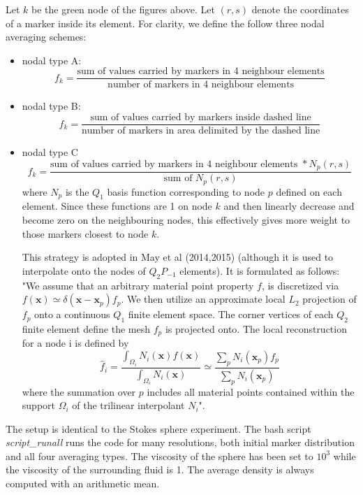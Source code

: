 Let $k$ be the green node of the figures above. Let $(r,s)$ denote the coordinates of a marker inside its element.
For clarity, we define the follow three nodal averaging schemes:
\begin{itemize}
\item nodal type A: 
\[
f_k = \frac{\text{sum of values carried by markers in 4 neighbour elements}}
{\text{number of markers in 4 neighbour elements}}
\]
\item nodal type B: 
\[
f_k = \frac{\text{sum of values carried by markers inside dashed line}}
{\text{number of markers in area delimited by the dashed line}}
\]
\item nodal type C 
\[
f_k = \frac{\text{sum of values carried by markers in 4 neighbour elements } * N_p(r,s)}
{\text{sum of }N_p(r,s)} 
\]
where $N_p$ is the $Q_1$ basis function corresponding to node $p$ defined on each element. Since these 
functions are 1 on node $k$ and then linearly decrease and become zero on the neighbouring nodes, this
effectively gives more weight to those markers closest to node $k$.

This strategy is adopted in May et al (2014,2015) \cite{mabl14,mabl15} 
(although it is used to interpolate onto the nodes of $Q_2P_{-1}$ elements). 
It is formulated as follows:\\
"We assume that an arbitrary material point property $f$, is discretized via 
$f(\bm x)\simeq \delta(\bm x - \bm x_p) f_p$. We then utilize an approximate local $L_2$ projection
of $f_p$ onto a continuous $Q_1$ finite element space. The corner vertices of
each $Q_2$ finite element define the mesh $f_p$ is projected onto.
The local reconstruction for a node i is defined by
\[
\hat{f}_i = \frac{\int_{\Omega_i}N_i(\bm x) f(\bm x)}{\int_{\Omega_i} N_i(\bm x)} \simeq
\frac{\sum_p N_i(\bm x_p) f_p }{\sum_p N_i(\bm x_p)}
\]
where the summation over $p$ includes all material points 
contained within the support $\Omega_i$ of the trilinear interpolant $N_i$".
\end{itemize}


The setup is identical to the Stokes sphere experiment. The bash script {\sl script\_runall} 
runs the code for many resolutions, both initial marker distribution and all four 
averaging types. The viscosity of the sphere has been 
set to $10^3$ while the viscosity of the surrounding fluid is 1. 
The average density is always computed with an arithmetic mean. 




